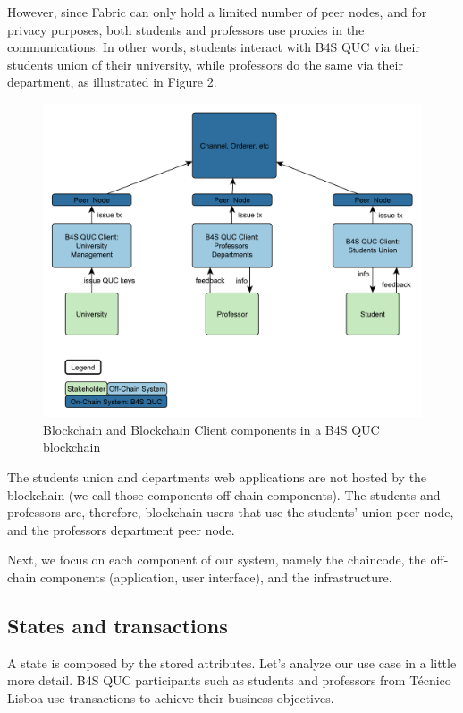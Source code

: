 \documentclass[12pt,a4paper]{article}
\theoremstyle{definition}
\begin{document}
However, since Fabric can only hold a limited number of peer nodes, and for privacy purposes, both students and professors use proxies in the communications. In other words, students interact with B4S QUC via their students union of their university, while professors  
do the same via their department, as illustrated in Figure 2.

\begin{figure}[h]
    \centering
    \includegraphics[scale=0.6]{figures/fig2.pdf}
    \caption{Blockchain and Blockchain Client components in a B4S QUC blockchain}
    \label{fig:actors_detailed}
\end{figure}

The students union and departments web applications are not hosted by the blockchain (we call those components off-chain components). The students and professors are, therefore, blockchain users that use the students' union peer node, and the professors department peer node. 

Next, we focus on each component of our system, namely the chaincode, the off-chain components (application, user interface), and the infrastructure.

\subsection{States and transactions}
 A state is composed by the stored attributes. Let’s analyze our use case in a little more detail. B4S QUC participants such as students and professors from Técnico Lisboa use transactions to achieve their business objectives.
 
\end{document}
